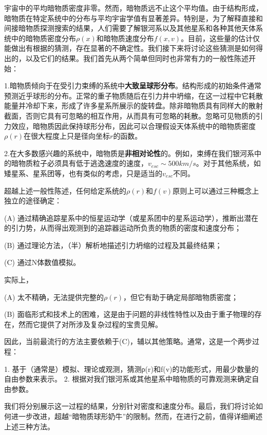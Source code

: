 


宇宙中的平均暗物质密度非零。然而，暗物质远不止这个平均值。由于结构形成，暗物质在特定系统中的分布与平均宇宙学值有显著差异。特别是，为了解释直接和间接暗物质探测搜索的结果，人们需要了解银河系以及其他星系和各种其他天体系统中的暗物质密度分布$\rho (x)$和暗物质速度分布$f(x, v)$。目前，这些量的估计仅能做出有根据的猜测，存在显著的不确定性。我们接下来将讨论这些猜测是如何得出的，以及它们的结果。我们首先从两个简单但同时也非常有力的一般性陈述开始：

1.暗物质倾向于在受引力束缚的系统中\textbf{大致呈球形分布}。结构形成的初始条件通常预测近乎球形的分布。正常的重子物质随后在引力井中坍缩，在这一过程中它耗散能量并冷却下来，形成了许多星系所展示的旋转盘。除非暗物质具有同样大的散射截面，否则它具有可忽略的相互作用，从而具有可忽略的耗散。忽略可见物质的引力效应，暗物质因此保持球形分布，因此可以合理假设天体系统中的暗物质密度$\rho(r)$在很大程度上只是径向坐标$r$的函数。

2.在大多数感兴趣的系统中，暗物质是\textbf{非相对论性}的。例如，束缚在我们银河系中的暗物质粒子必须具有低于逃逸速度的速度，$v_{esc} \sim 500 km/s$。对于其他系统，如矮星系、星系团等，也有类似的考虑，只是适当的$v_{esc}$不同。

超越上述一般性陈述，任何给定系统的$\rho(r)$和$f(v)$原则上可以通过三种概念上独立的途径确定：

(A) 通过精确追踪星系中的恒星运动学（或星系团中的星系运动学），推断出潜在的引力势，从而得出观测到的追踪器运动所负责的物质的密度和速度分布；

(B) 通过理论方法，（半）解析地描述引力坍缩的过程及其最终结果；

(C) 通过N体数值模拟。

实际上，

(A) 太不精确，无法提供完整的$\rho(r)$，但它有助于确定局部暗物质密度；

(B) 面临形式和技术上的困难，这是由于问题的非线性特性以及由于重子物理的存在，然而它提供了对所涉及复杂过程的宝贵见解。

因此，当前最流行的方法主要依赖于(C)，辅以其他策略。通常，这是一个两步过程：

1. 基于（通常是）模拟、理论或观测，猜测ρ(r)和f(v)的功能形式，用最少数量的自由参数来表示。
2. 根据对我们银河系或其他星系中暗物质的可靠观测来确定自由参数。

我们将分别展示这一过程的结果，分别针对密度和速度分布。最后，我们将讨论如何进一步改进，超越“暗物质球形奶牛”的限制。然而，在进行之前，值得详细阐述上述三种方法。

